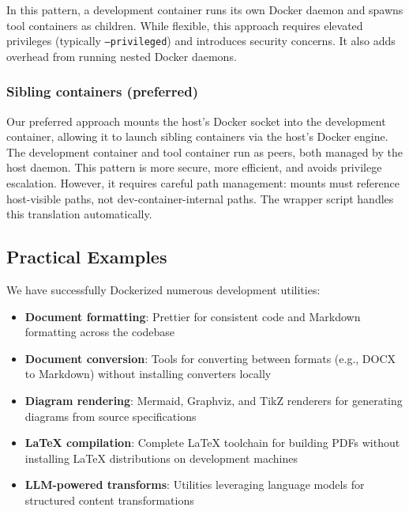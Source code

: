 In this pattern, a development container runs its own Docker daemon and
spawns tool containers as children. While flexible, this approach requires
elevated privileges (typically \texttt{--privileged}) and introduces
security concerns. It also adds overhead from running nested Docker daemons.

\subsubsection{Sibling containers (preferred)}

Our preferred approach mounts the host's Docker socket into the
development container, allowing it to launch sibling containers via the
host's Docker engine. The development container and tool container run
as peers, both managed by the host daemon. This pattern is more secure,
more efficient, and avoids privilege escalation. However, it requires
careful path management: mounts must reference host-visible paths, not
dev-container-internal paths. The wrapper script handles this translation
automatically.

\subsection{Practical Examples}

We have successfully Dockerized numerous development utilities:

\begin{itemize}
  \item \textbf{Document formatting}: Prettier for consistent code and
    Markdown formatting across the codebase

  \item \textbf{Document conversion}: Tools for converting between formats
    (e.g., DOCX to Markdown) without installing converters locally

  \item \textbf{Diagram rendering}: Mermaid, Graphviz, and TikZ renderers
    for generating diagrams from source specifications

  \item \textbf{LaTeX compilation}: Complete LaTeX toolchain for building
    PDFs without installing LaTeX distributions on development machines

  \item \textbf{LLM-powered transforms}: Utilities leveraging language
    models for structured content transformations
\end{itemize}

